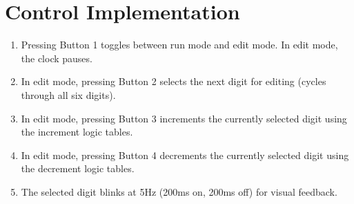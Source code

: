 \section{Control Implementation}
\begin{enumerate}
    \item Pressing Button 1 toggles between run mode and edit mode. In edit mode, the clock pauses.
    \item In edit mode, pressing Button 2 selects the next digit for editing (cycles through all six digits).
    \item In edit mode, pressing Button 3 increments the currently selected digit using the increment logic tables.
    \item In edit mode, pressing Button 4 decrements the currently selected digit using the decrement logic tables.
    \item The selected digit blinks at 5Hz (200ms on, 200ms off) for visual feedback.
\end{enumerate}
